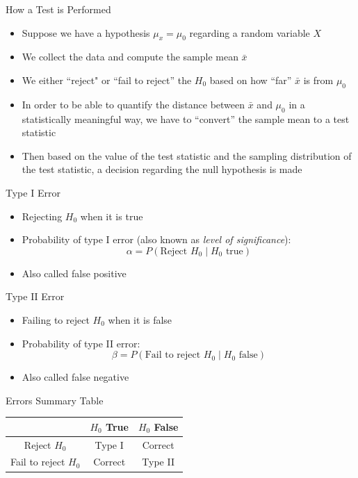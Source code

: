 \documentclass[12pt, aspectratio=169]{beamer}
\begin{document}
    \begin{frame}{How a Test is Performed}
        \begin{itemize}
            \item Suppose we have a hypothesis \(\mu_x = \mu_0\) regarding a random variable \(X\)
            \item We collect the data and compute the sample mean \(\bar{x}\)
            \item We either ``reject" or ``fail to reject'' the \(H_0\) based on how ``far'' \(\bar{x}\) is from \(\mu_0\)
            \item In order to be able to quantify the distance between \(\bar{x}\) and \(\mu_0\) in a statistically meaningful way, we have to ``convert'' the sample mean to a test statistic
            \item Then based on the value of the test statistic and the sampling distribution of the test statistic, a decision regarding the null hypothesis is made
        \end{itemize}
    \end{frame}


    \begin{frame}{Type I Error}
        \begin{itemize}
            \item Rejecting $H_0$ when it is true
            \item Probability of type I error (also known as \emph{level of significance}):
            \[
            \alpha = P(\text{Reject } H_0 \mid H_0 \text{ true})
            \]
            \item Also called false positive
        \end{itemize}
    \end{frame}


    \begin{frame}{Type II Error}
        \begin{itemize}
            \item Failing to reject $H_0$ when it is false
            \item Probability of type II error:
            \[
            \beta = P(\text{Fail to reject } H_0 \mid H_0 \text{ false})
            \]
            \item Also called false negative
        \end{itemize}
    \end{frame}


    \begin{frame}{Errors Summary Table}
        \begin{center}
            \begin{tabular}{c|cc}
                \hline
                & $H_0$ True & $H_0$ False \\
                \hline
                Reject $H_0$ & Type I & Correct \\
                Fail to reject $H_0$ & Correct & Type II \\
                \hline
            \end{tabular}
        \end{center}
    \end{frame}
\end{document}
